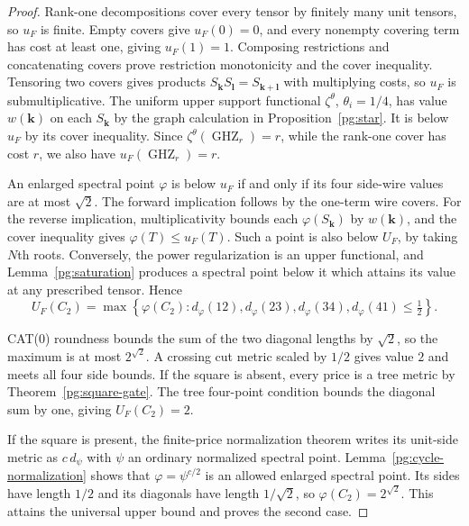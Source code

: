 \begin{proof}
Rank-one decompositions cover every tensor by finitely many unit
tensors, so $u_F$ is finite. Empty covers give $u_F(0)=0$, and
every nonempty covering term has cost at least one, giving
$u_F(1)=1$. Composing restrictions and concatenating covers prove
restriction monotonicity and the cover inequality. Tensoring
two covers gives products $S_{\mathbf k}S_{\mathbf l}
=S_{\mathbf k+\mathbf l}$ with multiplying costs, so
$u_F$ is submultiplicative. The uniform upper support functional
$\zeta^\theta$, $\theta_i=1/4$, has value
$w(\mathbf k)$ on each $S_{\mathbf k}$ by the graph calculation
in Proposition~\ref{pg:star}. It is below $u_F$ by its cover
inequality. Since $\zeta^\theta(\operatorname{GHZ}_r)=r$,
while the rank-one cover has cost $r$, we also have
$u_F(\operatorname{GHZ}_r)=r$.

An enlarged spectral point $\varphi$ is below $u_F$ if and only if
its four side-wire values are at most $\sqrt2$. The forward
implication follows by the one-term wire covers. For the reverse
implication, multiplicativity bounds each
$\varphi(S_{\mathbf k})$ by $w(\mathbf k)$, and the cover
inequality gives $\varphi(T)\leq u_F(T)$. Such a point is also
below $U_F$, by taking $N$th roots. Conversely, the power
regularization is an upper functional, and
Lemma~\ref{pg:saturation} produces a spectral point below it
which attains its value at any prescribed tensor. Hence
\[
 U_F(C_2)=\max\left\{\varphi(C_2):
 d_\varphi(12),d_\varphi(23),d_\varphi(34),d_\varphi(41)
 \leq\tfrac12\right\}.
 \tag{PG-CYCLE-dual}
\]

CAT(0) roundness bounds the sum of the two diagonal lengths by
$\sqrt2$, so the maximum is at most $2^{\sqrt2}$.
A crossing cut metric scaled by $1/2$ gives value $2$ and meets
all four side bounds. If the square is absent, every price is a
tree metric by Theorem~\ref{pg:square-gate}. The tree four-point
condition bounds the diagonal sum by one, giving $U_F(C_2)=2$.

If the square is present, the finite-price normalization theorem
writes its unit-side metric as $c\,d_\psi$ with $\psi$ an
ordinary normalized spectral point. Lemma~\ref{pg:cycle-normalization}
shows that $\varphi=\psi^{c/2}$ is an allowed enlarged spectral
point. Its sides have length $1/2$ and its diagonals have length
$1/\sqrt2$, so $\varphi(C_2)=2^{\sqrt2}$. This attains the
universal upper bound and proves the second case.
\end{proof}

